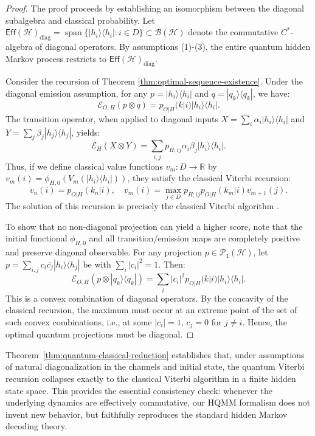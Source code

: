 \documentclass[12pt, reco]{article}
\begin{document}
\begin{proof}
The proof proceeds by establishing an isomorphism between the diagonal subalgebra and classical probability. Let $\mathsf{Eff}(\mathcal{H})_{\text{diag}} = \operatorname{span}\{|h_i\rangle\langle h_i| : i \in D\} \subset \mathcal{B}(\mathcal{H})$ denote the commutative $C^*$-algebra of diagonal operators. By assumptions (1)-(3), the entire quantum hidden Markov process restricts to $\mathsf{Eff}(\mathcal{H})_{\text{diag}}$.

Consider the recursion of Theorem \ref{thm:optimal-sequence-existence}. Under the diagonal emission assumption, for any $p = |h_i\rangle\langle h_i|$ and $q = |q_k\rangle\langle q_k|$, we have:
\[
\mathcal{E}_{O,H}(p \otimes q) = p_{O|H}(k|i) |h_i\rangle\langle h_i|.
\]
The transition operator, when applied to diagonal inputs $X = \sum_i \alpha_i |h_i\rangle\langle h_i|$ and $Y = \sum_j \beta_j |h_j\rangle\langle h_j|$, yields:
\[
\mathcal{E}_H(X \otimes Y) = \sum_{i,j} p_{H;ij} \alpha_i \beta_j |h_i\rangle\langle h_i|.
\]
Thus, if we define classical value functions $v_m: D \to \mathbb{R}$ by $v_m(i) = \phi_{H,0}(V_m(|h_i\rangle\langle h_i|))$, they satisfy the classical Viterbi recursion:
\[
v_n(i) = p_{O|H}(k_n|i), \quad
v_m(i) = \max_{j\in D} p_{H;ij} p_{O|H}(k_m|i) v_{m+1}(j).
\]
The solution of this recursion is precisely the classical Viterbi algorithm \cite{V03, FV05}.

To show that no non-diagonal projection can yield a higher score, note that the initial functional $\phi_{H,0}$ and all transition/emission maps are completely positive and preserve diagonal observable. For any projection $p \in \mathcal{P}_1(\mathcal{H})$, let $p = \sum_{i,j} c_i\overline{c_j} |h_i\rangle\langle h_j|$ be with $\sum_i |c_i|^2 = 1$. Then:
\[
\mathcal{E}_{O,H}(p \otimes |q_k\rangle\langle q_k|) = \sum_i |c_i|^2 p_{O|H}(k|i) |h_i\rangle\langle h_i|.
\]
This is a convex combination of diagonal operators. By the concavity of the classical recursion, the maximum must occur at an extreme point of the set of such convex combinations, i.e., at some $|c_i| = 1$, $c_j = 0$ for $j \neq i$. Hence, the optimal quantum projections must be diagonal.
\end{proof}

Theorem~\ref{thm:quantum-classical-reduction} establishes that, under assumptions of natural diagonalization in the channels and initial state, the quantum Viterbi recursion collapses exactly to the classical Viterbi algorithm in a finite hidden state space. This provides the essential consistency check: whenever the underlying dynamics are effectively commutative, our HQMM formalism does not invent new behavior, but faithfully reproduces the standard hidden Markov decoding theory.
\end{document}
